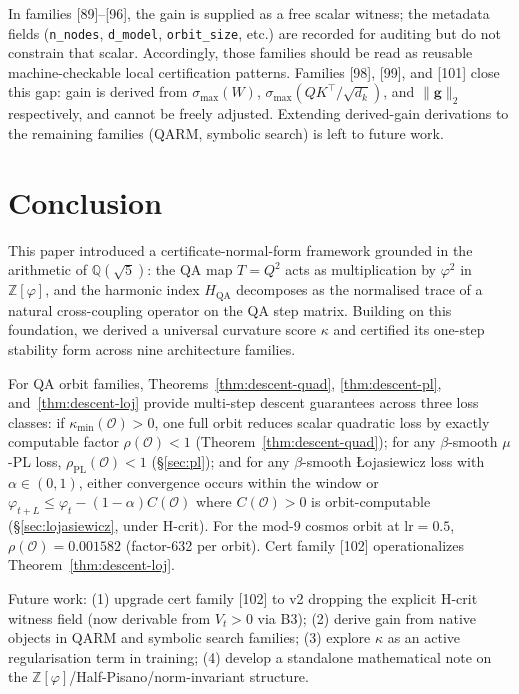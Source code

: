 \documentclass[11pt]{article}
\theoremstyle{definition}
\theoremstyle{remark}
\newcommand{\hqa}{H_{\mathrm{QA}}}
\newcommand{\kmin}{\kappa_{\min}}
\newcommand{\rhoO}{\rho(\mathcal{O})}
\newcommand{\rhoPL}{\rho_{\mathrm{PL}}(\mathcal{O})}
\newcommand{\Zfi}{\mathbb{Z}[\varphi]}
\newcommand{\Qfi}{\mathbb{Q}(\sqrt{5})}
\begin{document}
In families [89]--[96], the gain is supplied as a free scalar witness; the metadata
fields (\texttt{n\_nodes}, \texttt{d\_model}, \texttt{orbit\_size}, etc.) are
recorded for auditing but do not constrain that scalar. Accordingly, those families
should be read as reusable machine-checkable local certification patterns. Families
[98], [99], and [101] close this gap: gain is derived from $\sigma_{\max}(W)$,
$\sigma_{\max}(QK^\top/\!\sqrt{d_k})$, and $\|\mathbf{g}\|_2$ respectively, and
cannot be freely adjusted. Extending derived-gain derivations to the remaining
families (QARM, symbolic search) is left to future work.

\section{Conclusion}

This paper introduced a certificate-normal-form framework grounded in the arithmetic
of $\Qfi$: the QA map $T=Q^2$ acts as multiplication by $\varphi^2$ in $\Zfi$, and
the harmonic index $\hqa$ decomposes as the normalised trace of a natural
cross-coupling operator on the QA step matrix. Building on this foundation, we
derived a universal curvature score $\kappa$ and certified its one-step stability
form across nine architecture families.

For QA orbit families, Theorems~\ref{thm:descent-quad}, \ref{thm:descent-pl},
and~\ref{thm:descent-loj} provide multi-step descent guarantees across three loss
classes: if $\kmin(\mathcal{O})>0$, one full orbit reduces scalar quadratic loss by
exactly computable factor $\rhoO<1$ (Theorem~\ref{thm:descent-quad}); for any
$\beta$-smooth $\mu$-PL loss, $\rhoPL<1$ (§\ref{sec:pl}); and for any
$\beta$-smooth \L{}ojasiewicz loss with $\alpha\in(0,1)$, either convergence occurs
within the window or $\varphi_{t+L}\leq\varphi_t-(1-\alpha)C(\mathcal{O})$ where
$C(\mathcal{O})>0$ is orbit-computable (§\ref{sec:lojasiewicz}, under H-crit).
For the mod-9 cosmos orbit at $\mathrm{lr}=0.5$, $\rhoO=0.001582$ (factor-632 per
orbit). Cert family [102] operationalizes Theorem~\ref{thm:descent-loj}.

Future work: (1) upgrade cert family [102] to v2 dropping the explicit H-crit
witness field (now derivable from $V_t>0$ via B3); (2) derive gain from native objects in QARM and
symbolic search families; (3) explore $\kappa$ as an active regularisation term in
training; (4) develop a standalone mathematical note on the
$\Zfi$/Half-Pisano/norm-invariant structure.
\end{document}
